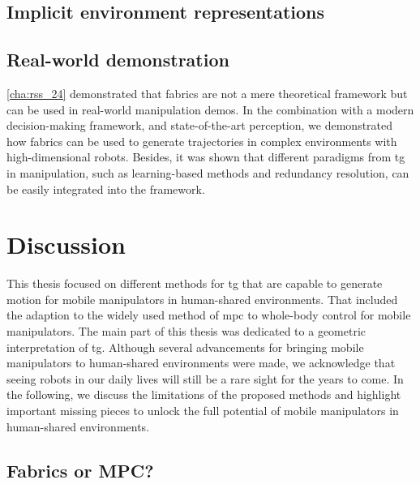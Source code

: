 \subsection{Implicit environment representations}
\label{sec:conclusion_implicit}


\subsection{Real-world demonstration}
\label{sec:conclusion_real_world}

\cref{cha:rss_24} demonstrated that \ac{fabrics} are not a mere theoretical
framework but can be used in real-world manipulation demos. In the combination
with a modern decision-making framework, and state-of-the-art perception, 
we demonstrated how \ac{fabrics} can be used to generate trajectories in complex
environments with high-dimensional robots. Besides, it was shown that different
paradigms from \ac{tg} in manipulation, such as learning-based methods and
redundancy resolution, can be easily integrated into the framework.

\section{Discussion}
\label{sec:discussion}

This thesis focused on different methods for \ac{tg} that are capable to
generate motion for mobile manipulators in human-shared environments. That
included the adaption to the widely used method of \ac{mpc}
to whole-body control for mobile
manipulators. The main part of this thesis was dedicated to a geometric
interpretation of \ac{tg}. Although several advancements for bringing mobile
manipulators to human-shared environments were made, we acknowledge
that seeing robots in our daily lives will still be a rare sight for the years
to come. In the following, we discuss the limitations of the proposed methods
and highlight important missing pieces to unlock the full potential of mobile
manipulators in human-shared environments.

\subsection{Fabrics or MPC?}
\label{sec:discussion_fabrics_or_mpc}


